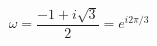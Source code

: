 \documentclass{article}
\begin{document}
\begin{titlepage}


\begin{equation*}
\omega = \frac{-1 + i\sqrt 3}{2} = e^{i2\pi/3}
\end{equation*}


\end{titlepage}
\end{document}
